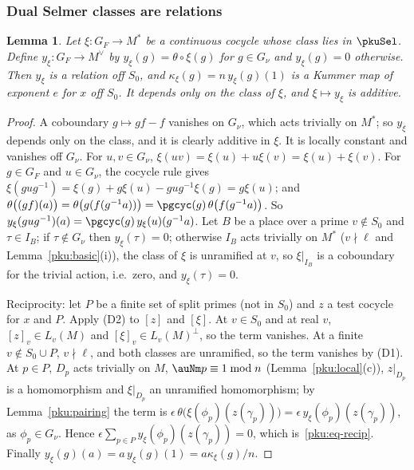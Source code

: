 \documentclass[10pt]{amsart}
\newtheorem{lemma}[theorem]{Lemma}
\theoremstyle{definition}
\theoremstyle{remark}
\begin{document}
\subsubsection{Dual Selmer classes are relations}\label{pku:ss-relations}

\begin{lemma}\label{pku:relation}
Let $\xi\colon G_F\to M^*$ be a continuous cocycle whose class lies in $\pkuSel$. Define $y_\xi
\colon G_F\to M^\vee$ by $y_\xi(g)=\theta\circ\xi(g)$ for $g\in G_\nu$ and $y_\xi(g)=0$ otherwise.
Then $y_\xi$ is a relation off $S_0$, and $\kappa_\xi(g)=n\,y_\xi(g)(1)$ is a Kummer map of exponent
$e$ for $x$ off $S_0$. It depends only on the class of $\xi$, and $\xi\mapsto y_\xi$ is additive.
\end{lemma}
\begin{proof}
A coboundary $g\mapsto gf-f$ vanishes on $G_\nu$, which acts trivially on $M^*$; so $y_\xi$
depends only on the class, and it is clearly additive in $\xi$. It is locally constant and vanishes
off $G_\nu$. For $u,v\in G_\nu$, $\xi(uv)=\xi(u)+u\xi(v)=\xi(u)+\xi(v)$. For $g\in G_F$ and $u\in
G_\nu$, the cocycle rule gives $\xi(gug^{-1})=\xi(g)+g\xi(u)-gug^{-1}\xi(g)=g\xi(u)$; and
$\theta\bigl((gf)(a)\bigr)=\theta\bigl(g(f(g^{-1}a))\bigr)=\pgcyc(g)\,\theta\bigl(f(g^{-1}a)\bigr)$.
So $y_\xi(gug^{-1})(a)=\pgcyc(g)\,y_\xi(u)(g^{-1}a)$. Let $B$ be a place over a prime $v\notin S_0$
and $\tau\in I_B$; if $\tau\notin G_\nu$ then $y_\xi(\tau)=0$; otherwise $I_B$ acts trivially on $M^*$
($v\nmid\ell$ and Lemma~\ref{pku:basic}(i)), the class of $\xi$ is unramified at $v$, so $\xi|_{I_B}$
is a coboundary for the trivial action, i.e.\ zero, and $y_\xi(\tau)=0$.

Reciprocity: let $P$ be a finite set of split primes (not in $S_0$) and $z$ a test cocycle for $x$
and $P$. Apply (D2) to $[z]$ and $[\xi]$. At $v\in S_0$ and at real $v$, $[z]_v\in L_v(M)$ and
$[\xi]_v\in L_v(M)^\perp$, so the term vanishes. At a finite $v\notin S_0\cup P$, $v\nmid\ell$, and
both classes are unramified, so the term vanishes by (D1). At $p\in P$, $D_p$ acts trivially on $M$,
$\auNm p\equiv1\bmod n$ (Lemma~\ref{pku:local}(c)), $z|_{D_p}$ is a homomorphism and $\xi|_{D_p}$ an
unramified homomorphism; by Lemma~\ref{pku:pairing} the term is $\epsilon\,\theta\bigl(\xi(\phi_p)(
z(\gamma_p))\bigr)=\epsilon\,y_\xi(\phi_p)(z(\gamma_p))$, as $\phi_p\in G_\nu$. Hence $\epsilon\sum_{p\in
P}y_\xi(\phi_p)(z(\gamma_p))=0$, which is~\eqref{pku:eq-recip}. Finally $y_\xi(g)(a)=a\,y_\xi(g)(1)
=a\kappa_\xi(g)/n$.
\end{proof}
\end{document}
